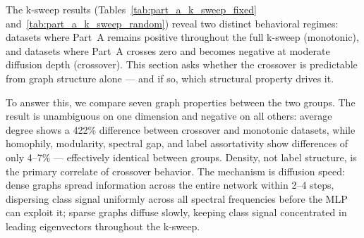 \documentclass[11pt]{article}
\begin{document}
The k-sweep results (Tables~\ref{tab:part_a_k_sweep_fixed} and~\ref{tab:part_a_k_sweep_random})
reveal two distinct behavioral regimes: datasets where Part~A remains positive throughout
the full k-sweep (monotonic), and datasets where Part~A crosses zero and becomes negative
at moderate diffusion depth (crossover).  This section asks whether the crossover is
predictable from graph structure alone --- and if so, which structural property drives it.

To answer this, we compare seven graph properties between the two groups.
The result is unambiguous on one dimension and negative on all others:
average degree shows a 422\% difference between crossover and monotonic datasets,
while homophily, modularity, spectral gap, and label assortativity show differences
of only 4--7\% --- effectively identical between groups.
Density, not label structure, is the primary correlate of crossover behavior.
The mechanism is diffusion speed: dense graphs spread information across the entire
network within 2--4 steps, dispersing class signal uniformly across all spectral
frequencies before the MLP can exploit it; sparse graphs diffuse slowly, keeping
class signal concentrated in leading eigenvectors throughout the k-sweep.
\end{document}
